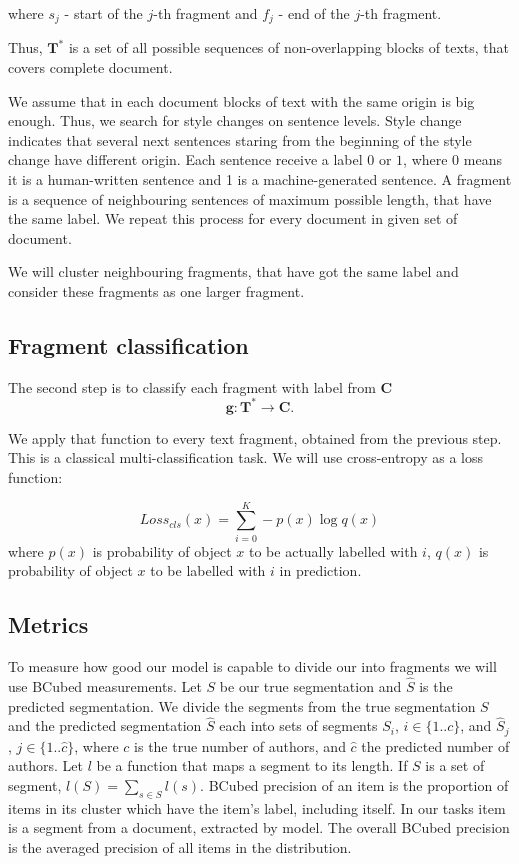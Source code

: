 \documentclass{article}
\begin{document}
where $s_j$ - start of the $j$-th fragment and $f_j$ - end of the $j$-th fragment.

Thus, $\mathbf{T}^*$ is a set of all possible sequences of non-overlapping blocks of texts, that covers complete document.

We assume that in each document blocks of text with the same origin is big enough. Thus, we search for style changes on sentence levels. Style change indicates that several next sentences staring from the beginning of the style change have different origin. Each sentence receive a label $0$ or $1$, where 0 means it is a human-written sentence and 1 is a machine-generated sentence. A fragment is a sequence of neighbouring sentences of maximum possible length, that have the same label. We repeat this process for every document in given set of document. 

We will cluster neighbouring fragments, that have got the same label and consider these fragments as one larger fragment. 

\subsection{Fragment classification}

The second step is to classify each fragment with label from $\mathbf{C}$
$$\mathbf{g}: \mathbf{T}^* \rightarrow \mathbf{C}.$$

We apply that function to every text fragment, obtained from the previous step. This is a classical multi-classification task. We will use cross-entropy as a loss function:

$$Loss_{cls}(x) = \sum_{i=0}^K-p(x)\log q(x)$$ 
where $p(x)$ is probability of object $x$ to be actually labelled with $i$,
$q(x)$ is  probability of object $x$ to be labelled with $i$  in prediction.

\subsection{Metrics}

To measure how good our model is capable to divide our into fragments we will use BCubed\cite{bcubed} measurements.
Let $S$ be our true segmentation and $\hat{S}$  is the predicted segmentation. We divide the segments from the true segmentation $S$ and the predicted segmentation $\hat{S}$ each into sets of segments $S_i$, $i\in\{1..c\}$, and $\hat{S}_j$, $j\in\{1..\hat{c}\}$, where $c$ is the true number of authors, and $\hat{c}$ the predicted number of authors. Let $l$ be a function that maps a segment to its length. If $S$ is a set of segment, $l(S) = \sum_{s \in S}l(s)$. BCubed precision of an item is the proportion of items in its cluster which have the item’s label, including itself. In our tasks item is a segment from a document, extracted by model. The overall BCubed precision is the averaged precision of all items in the distribution.  
\end{document}
